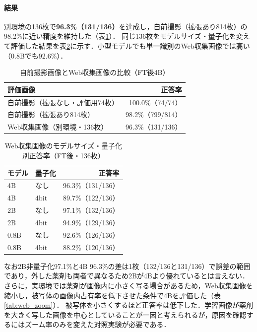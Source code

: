 \documentclass[dvipdfmx]{jsarticle}
\begin{document}
\paragraph{結果}
別環境の136枚で\textbf{96.3\%（131/136）}を達成し，自前撮影（拡張あり814枚）の98.2\%に近い精度を維持した（表\ref{tab:web_main}）．
同じ136枚をモデルサイズ・量子化を変えて評価した結果を表\ref{tab:web_size}に示す．小型モデルでも単一識別のWeb収集画像では高い（0.8Bでも92.6\%）．

\begin{table}[htbp]
\centering
\caption{自前撮影画像とWeb収集画像の比較（FT後4B）}
\label{tab:web_main}
\begin{tabular}{lr}
\hline
評価画像 & 正答率 \\
\hline
自前撮影（拡張なし・評価用74枚） & 100.0\%（74/74） \\
自前撮影（拡張あり814枚） & 98.2\%（799/814） \\
Web収集画像（別環境・136枚） & 96.3\%（131/136） \\
\hline
\end{tabular}
\end{table}

\begin{table}[htbp]
\centering
\caption{Web収集画像のモデルサイズ・量子化別正答率（FT後・136枚）}
\label{tab:web_size}
\begin{tabular}{llr}
\hline
モデル & 量子化 & 正答率 \\
\hline
4B & なし & 96.3\%（131/136） \\
4B & 4bit & 89.7\%（122/136） \\
2B & なし & 97.1\%（132/136） \\
2B & 4bit & 94.9\%（129/136） \\
0.8B & なし & 92.6\%（126/136） \\
0.8B & 4bit & 88.2\%（120/136） \\
\hline
\end{tabular}
\end{table}

なお2B非量子化97.1\%と4B 96.3\%の差は1枚（132/136と131/136）で誤差の範囲であり，外した薬剤も両者で異なるため2Bが4Bより優れているとは言えない．
さらに，実環境では薬剤が画像内に小さく写る場合があるため，Web収集画像を縮小し，被写体の画像内占有率を低下させた条件で4Bを評価した（表\ref{tab:web_zoom}）．
被写体を小さくするほど正答率は低下した．学習画像が薬剤を大きく写した画像を中心としていることが一因と考えられるが，原因を確認するにはズーム率のみを変えた対照実験が必要である．
\end{document}
